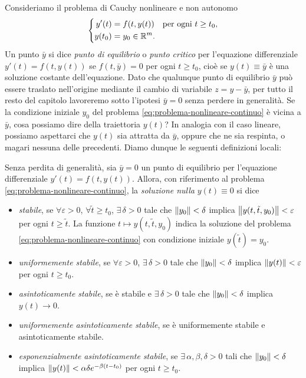 Consideriamo il problema di Cauchy nonlineare e non autonomo
\begin{equation} \label{eq:problema-nonlineare-continuo}
\left\{
\begin{aligned}
y'(t)  &= f(t,y(t)) \quad \text{per ogni $t \geq t_0$}, \\
y(t_0) &= y_0 \in \mathbb{R}^m.
\end{aligned}
\right.
\end{equation}
Un punto $\bar{y}$ si dice \emph{punto di equilibrio} o \emph{punto critico}
per l'equazione differenziale $y'(t) = f(t,y(t))$ se $f(t,\bar{y}) = 0$
per ogni $t \geq t_0$, cioè se $y(t) \equiv \bar{y}$ è una soluzione
costante dell'equazione. Dato che qualunque punto di equilibrio $\bar{y}$
può essere traslato nell'origine mediante il cambio di variabile
$z = y - \bar{y}$, per tutto il resto del capitolo lavoreremo sotto
l'ipotesi $\bar{y} = 0$ senza perdere in generalità.
Se la condizione iniziale $y_0$ del problema \eqref{eq:problema-nonlineare-continuo}
è vicina a $\bar{y}$, cosa possiamo dire della traiettoria $y(t)$?
In analogia con il caso lineare, possiamo aspettarci che $y(t)$ sia
attratta da $\bar{y}$, oppure che ne sia respinta, o magari nessuna delle
precedenti. Diamo dunque le seguenti definizioni locali:
\begin{defi}
Senza perdita di generalità, sia $\bar{y} = 0$ un punto di equilibrio
per l'equazione differenziale $y'(t) = f(t,y(t))$. Allora, con riferimento
al problema \eqref{eq:problema-nonlineare-continuo}, la \emph{soluzione nulla}
$y(t) \equiv 0$ si dice
\begin{itemize}
\item \emph{stabile},
	se $\forall \varepsilon > 0$,
	$\forall \tilde{t} \geq t_0$,
	$\exists\, \delta > 0$
	tale che $\left\lVert y_0\right\rVert < \delta$
	implica $\left\lVert y(t,\tilde{t},y_0)\right\rVert < \varepsilon$
	per ogni $t \geq \tilde{t}$.
	La funzione $t \mapsto y(t,\tilde{t},y_0)$ indica la soluzione del problema
	\eqref{eq:problema-nonlineare-continuo} con condizione iniziale $y(\tilde{t}) = y_0$.
\item \emph{uniformemente stabile},
	se $\forall \varepsilon > 0$,
	$\exists\, \delta > 0$
	tale che $\left\lVert y_0\right\rVert < \delta$
	implica $\left\lVert y(t)\right\rVert < \varepsilon$
	per ogni $t \geq t_0$.
\item \emph{asintoticamente stabile},
	se è stabile e
	$\exists\, \delta > 0$
	tale che $\left\lVert y_0\right\rVert < \delta$
	implica $y(t) \to 0$.
\item \emph{uniformemente asintoticamente stabile},
	se è uniformemente stabile e asintoticamente stabile.
\item \emph{esponenzialmente asintoticamente stabile},
	se $\exists\, \alpha,\beta,\delta > 0$
	tali che $\left\lVert y_0\right\rVert < \delta$
	implica $\left\lVert y(t)\right\rVert < \alpha \delta e^{-\beta(t-t_0)}$
	per ogni $t \geq t_0$.
\end{itemize}
\end{defi}

